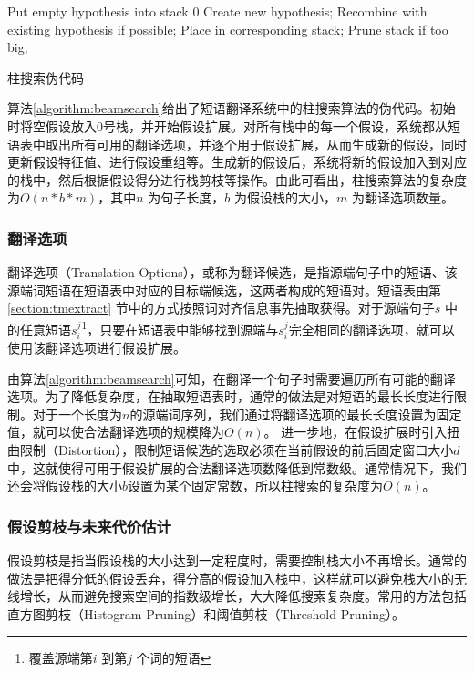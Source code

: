 \documentclass[master, winfont]{njuthesis}
\begin{document}
\begin{algorithm}
\begin{algorithmic}[1]
\STATE Put empty hypothesis into stack 0
                \STATE Create new hypothesis;
                \STATE Recombine with existing hypothesis if possible;
                \STATE Place in corresponding stack;
                \STATE Prune stack if too big;
            \ENDIF
        \ENDFOR
    \ENDFOR
\ENDFOR
\end{algorithmic}
\caption{\label{algorithm:beamsearch}柱搜索伪代码}
\end{algorithm}

算法\ref{algorithm:beamsearch}给出了短语翻译系统中的柱搜索算法的伪代码。初始时将空假设放入0号栈，并开始假设扩展。对所有栈中的每一个假设，系统都从短语表中取出所有可用的翻译选项，并逐个用于假设扩展，从而生成新的假设，同时更新假设特征值、进行假设重组等。生成新的假设后，系统将新的假设加入到对应的栈中，然后根据假设得分进行栈剪枝等操作。由此可看出，柱搜索算法的复杂度为$O(n*b*m)$，其中$n$ 为句子长度，$b$ 为假设栈的大小，$m$ 为翻译选项数量。

\subsubsection{翻译选项}
翻译选项（Translation Options），或称为翻译候选，是指源端句子中的短语、该源端词短语在短语表中对应的目标端候选，这两者构成的短语对。短语表由第\ref{section:tmextract} 节中的方式按照词对齐信息事先抽取获得。对于源端句子$s$ 中的任意短语$s_i^j$\footnote{覆盖源端第$i$ 到第$j$ 个词的短语}，只要在短语表中能够找到源端与$s_i^j$完全相同的翻译选项，就可以使用该翻译选项进行假设扩展。

由算法\ref{algorithm:beamsearch}可知，在翻译一个句子时需要遍历所有可能的翻译选项。为了降低复杂度，在抽取短语表时，通常的做法是对短语的最长长度进行限制。对于一个长度为$n$的源端词序列，我们通过将翻译选项的最长长度设置为固定值，就可以使合法翻译选项的规模降为$O(n)$。 进一步地，在假设扩展时引入扭曲限制（Distortion），限制短语候选的选取必须在当前假设的前后固定窗口大小$d$中，这就使得可用于假设扩展的合法翻译选项数降低到常数级。通常情况下，我们还会将假设栈的大小$b$设置为某个固定常数，所以柱搜索的复杂度为$O(n)$。

\subsubsection{假设剪枝与未来代价估计}
假设剪枝是指当假设栈的大小达到一定程度时，需要控制栈大小不再增长。通常的做法是把得分低的假设丢弃，得分高的假设加入栈中，这样就可以避免栈大小的无线增长，从而避免搜索空间的指数级增长，大大降低搜索复杂度。常用的方法包括直方图剪枝（Histogram Pruning）和阈值剪枝（Threshold Pruning）。
\end{document}
